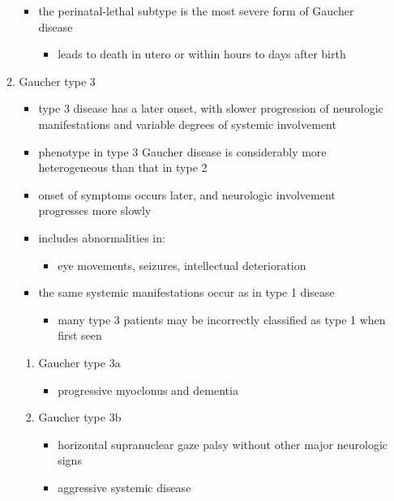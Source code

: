 \documentclass{scrartcl}
\begin{document}
\begin{enumerate}
\begin{enumerate}
\begin{itemize}
\item the perinatal-lethal subtype is the most severe form of Gaucher
disease
\begin{itemize}
\item leads to death in utero or within hours to days after
birth
\end{itemize}
\end{itemize}

\item Gaucher type 3
\label{sec:org10c9ef5}
\begin{itemize}
\item type 3 disease has a later onset, with slower progression of
neurologic manifestations and variable degrees of systemic
involvement
\item phenotype in type 3 Gaucher disease is considerably more
heterogeneous than that in type 2

\item onset of symptoms occurs later, and neurologic involvement
progresses more slowly

\item includes abnormalities in:
\begin{itemize}
\item eye movements, seizures, intellectual deterioration
\end{itemize}

\item the same systemic manifestations occur as in type 1 disease
\begin{itemize}
\item many type 3 patients may be incorrectly classified as type 1 when
first seen
\end{itemize}
\end{itemize}

\begin{enumerate}
\item Gaucher type 3a
\label{sec:orga6ece1c}
\begin{itemize}
\item progressive myoclonus and dementia
\end{itemize}

\item Gaucher type 3b
\label{sec:orgf7b71cb}
\begin{itemize}
\item horizontal supranuclear gaze palsy without other major
neurologic signs
\item aggressive systemic disease
\end{itemize}


\end{enumerate}
\end{enumerate}
\end{enumerate}
\end{document}
